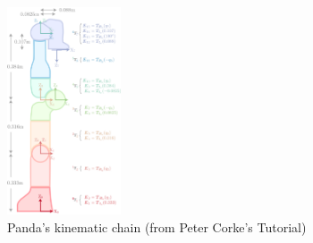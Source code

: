 \documentclass[10pt]{article}
\begin{document}
\begin{figure}[H]
    \centering
    \includegraphics[max width=0.3\textwidth]{kinematics/cover.png}
    \caption{Panda’s kinematic chain (from Peter Corke's Tutorial)}
\end{figure}
\end{document}
